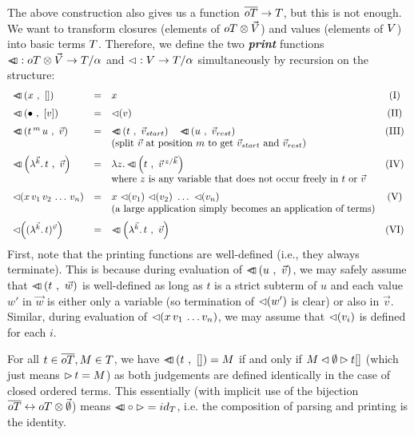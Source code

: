 \documentclass[submission,copyright,creativecommons]{eptcs}
\newcommand{\define}[1]{\mbox{\textbf{\textit{#1}}}}
\begin{document}
The above construction also gives us a function $\overline{oT} \rightarrow
T$, but this is not enough. We want to transform closures
(elements of $oT \otimes \vec {V}$) and values (elements of $V$) 
into basic terms $T$.
Therefore, we
define the two \define{print} functions ${\lhd \hspace{-6pt} \lhd} : oT \otimes \vec {V} \rightarrow T / \alpha$ and ${\mathord{\lhd}} : V \rightarrow T / \alpha$ simultaneously by recursion on the structure:
\[
\begin{array}{lclc}
\medskip
\pr{x}{\emptyVec} & = & x & \lab I \\
\medskip
\pr{\ovar}{[v]} & = & \prVal v & \lab {II} \\
\pr{t \oapp m u}{\vec v} & = & \ApA {\pr {t}{\vstart}  }  {\quad \pr
  {u}{\vrest}}  & \lab {III} \\
\medskip
&& \mbox{(split $\vec v$ at position $m$ to get $\vstart$ and $\vrest$)} \\
\pr{\LaO {\vec k} t}{\vec v} & = & \LaA z {\pr {t} {  \multiinsert{\vec v}{\vec k}{z}   }}   & \lab {IV}\\
\medskip
&& \mbox{where $z$ is any variable that does not occur freely in $t$ or $\vec v$ } \\
\prVal{x \sspace v_1 \sspace v_2 \sspace \ldots \sspace v_n} & = & x \ \prVal{v_1} \ \prVal{v_2} \ \ldots \ \prVal{v_n} & \lab V\\
\medskip && \mbox{(a large application simply becomes an application of terms)} \\
\prVal{\Val {\vec k} t {\vec v}} & = & \pr{\LaO {\vec k} t}{\vec v}  & \lab {VI}\\
\end{array}
\]
First, note that the printing functions are well-defined (i.e., they always terminate). This is because during evaluation of ${ {\lhd \hspace{-6pt} \lhd} \left( u \ , \ \vec v \right)}$, we may safely assume that ${ {\lhd \hspace{-6pt} \lhd} \left( t \ , \ \vec w \right)}$ is well-defined as long as $t$ is a strict subterm of $u$ and each value $w'$ in $\vec w$ is either only a variable (so termination of ${\lhd \hspace{-2pt} \left( w' \right)}$ is clear) or also in $\vec v$. Similar, during evaluation of ${\lhd \hspace{-2pt} \left( x \, v_1 \, \ldots v_n \right)}$, we may assume that ${\lhd \hspace{-2pt} \left( v_i \right)}$ is defined for each $i$.

For all $t \in \overline{oT}, M \in T$, we have ${ {\lhd \hspace{-6pt} \lhd} \left( t \ , \ [] \right)} = M$ if and only if ${M \lhd \emptyset \rhd t[ ]}$ (which just means $\mathop{\rhd} t = M$) as both judgements are defined identically in the case of closed ordered terms. This essentially (with implicit use of the bijection $\overline{oT} \leftrightarrow oT \otimes \vec {\emptyset}$) means ${\lhd \hspace{-6pt} \lhd} \circ \mathop{\rhd}  = id_{T}$, i.e. the composition of parsing and printing is the identity.
\end{document}
